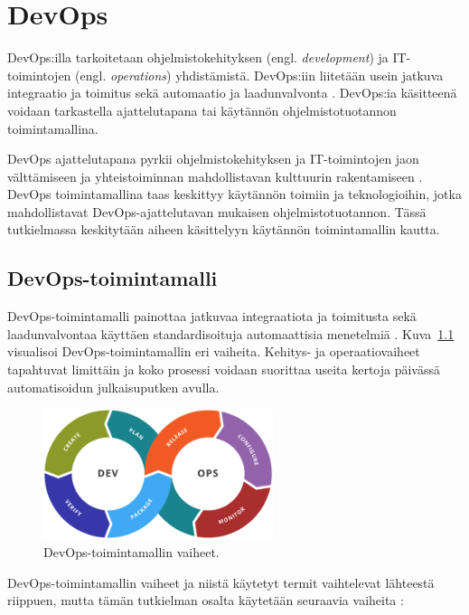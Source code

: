 \chapter{DevOps\label{devops}}

DevOps:illa tarkoitetaan ohjelmistokehityksen (engl. \textit{development}) ja IT-toimintojen (engl. \textit{operations}) yhdistämistä.
DevOps:iin liitetään usein jatkuva integraatio ja toimitus sekä automaatio ja laadunvalvonta \cite{Jabbari16, Leite19}.
DevOps:ia käsitteenä voidaan tarkastella ajattelutapana tai käytännön ohjelmistotuotannon toimintamallina.

DevOps ajattelutapana pyrkii ohjelmistokehityksen ja IT-toimintojen jaon välttämiseen ja yhteistoiminnan mahdollistavan kulttuurin rakentamiseen \cite{Klein21}.
DevOps toimintamallina taas keskittyy käytännön toimiin ja teknologioihin, jotka mahdollistavat DevOps-ajattelutavan mukaisen ohjelmistotuotannon.
Tässä tutkielmassa keskitytään aiheen käsittelyyn käytännön toimintamallin kautta.

\section{DevOps-toimintamalli}

DevOps-toimintamalli painottaa jatkuvaa integraatiota ja toimitusta sekä laadunvalvontaa käyttäen standardisoituja automaattisia menetelmiä \cite{Leite19}.
Kuva~\ref{fig:devops} visualisoi DevOps-toimintamallin eri vaiheita.
Kehitys- ja operaatiovaiheet tapahtuvat limittäin ja koko prosessi voidaan suorittaa useita kertoja päivässä automatisoidun julkaisuputken avulla.

\begin{figure}[ht]
\begin{center}
\includegraphics[width=0.6\textwidth]{figures/devops_toolchain.png}
\caption{DevOps-toimintamallin vaiheet.\cite{Wikimedia23}\label{fig:devops}}
\end{center}
\end{figure}

DevOps-toimintamallin vaiheet ja niistä käytetyt termit vaihtelevat lähteestä riippuen, mutta tämän tutkielman osalta käytetään seuraavia vaiheita \cite{Alnafessah21}:

